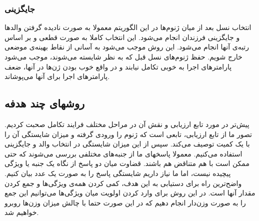 \documentclass{report}
\begin{document}
\subsubsection{جایگزینی}
انتخاب نسل بعد از میان ژنوم‌ها در این الگوریتم معمولا به صورت نادیده گرفتن والدها و جایگزینی فرزندان انجام می‌شود. این انتخاب کاملا به صورت قطعی و بر اساس رتبه‌ی آنها انجام می‌شود. این روش موجب می‌شود به آسانی از نقاط بهینه‌ی موضعی خارج شویم. حفظ ژنوم‌های نسل قبل که به نظر شایسته می‌شوند، موجب می‌شود پارامترهای اجرا به خوبی تکامل نیابند و در واقع خوب بودن ژن‌ها در آنها، ضعف پارامترهای اجرا برای آنها می‌پوشاند.

\subsection{روشهای چند هدفه}
پیش‌تر در مورد تابع ارزیابی و نقش آن در مراحل مختلف فرایند تکامل صحبت کردیم. تصور ما از تابع ارزیابی، تابعی است که ژنوم را ورودی گرفته و میزان شایستگی آن را با یک کمیت توصیف می‌کند. سپس از این میزان شایستگی در انتخاب والد و جایگزینی استفاده می‌کنیم. معمولا پاسخهای ما از جنبه‌های مختلفی بررسی می‌شوند که حتی ممکن است با هم متناقض هم باشند. قضاوت میان دو پاسخ از نگاه یک جنبه یا ویژگی پیچیده نیست، اما ما نیاز داریم شایستگی پاسخ را به صورت یک عدد بیان کنیم. واضح‌ترین راه برای دستیابی به این هدف، کمی کردن همه‌ی ويژگی‌ها و جمع کردن مقدار آنها است. در این روش برای وارد کردن اولویت میان ویژگی‌ها می‌توانیم این جمع را به صورت وزن‌دار انجام دهیم که در این صورت حتما با چالش میزان وزن‌ها روبرو خواهیم شد.
\end{document}
